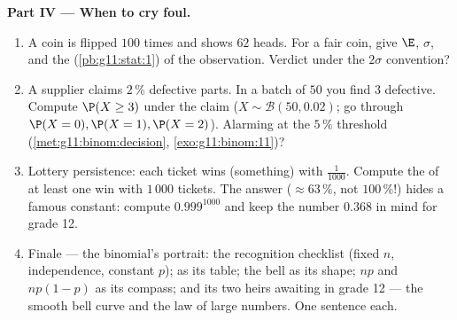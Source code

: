 \begin{problem}
\medskip
\noindent\textbf{Part IV --- When to cry foul.}
\begin{enumerate}[resume]
  \item A coin is flipped $100$ times and shows $62$ heads. For
        a fair coin, give $\E$, $\sigma$, and the 
        (\cref{pb:g11:stat:1}) of the observation. Verdict
        under the $2\sigma$ convention?
  \item A supplier claims $2\,\%$ defective parts. In a batch
        of $50$ you find $3$ defective. Compute
        $\P(X \geq 3)$ under the claim
        ($X \sim \mathcal B(50, 0.02)$; go through
        $\P(X = 0), \P(X = 1), \P(X = 2)$). Alarming at the
        $5\,\%$ threshold (\cref{met:g11:binom:decision},
        \cref{exo:g11:binom:11})?
  \item Lottery persistence: each ticket wins (something) with
         $\frac{1}{1000}$. Compute the 
        of at least one win with $1\,000$ tickets. The answer
        ($\approx 63\,\%$, not $100\,\%$!) hides a famous
        constant: compute $0.999^{1000}$ and keep the number
        $0.368$ in mind for grade 12.
  \item Finale --- the binomial's portrait: the recognition
        checklist (fixed $n$, independence, constant $p$);
         as its table; the bell as its shape;
        $np$ and $np(1-p)$ as its compass; and its two heirs
        awaiting in grade 12 --- the smooth bell curve and the
        law of large numbers. One sentence each.
\end{enumerate}
\end{problem}
